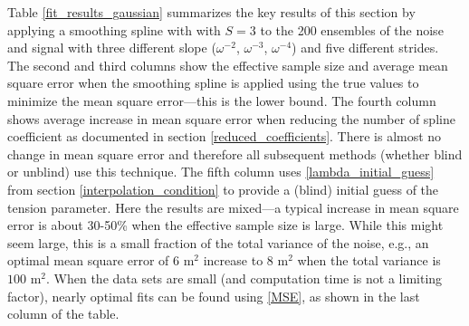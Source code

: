 \documentclass{ametsoc}
\begin{document}
Table \ref{fit_results_gaussian} summarizes the key results of this section by applying a smoothing spline with with $S=3$ to the 200 ensembles of the noise and signal with three different slope ($\omega^{-2}$, $\omega^{-3}$, $\omega^{-4}$) and five different strides. The second and third columns show the effective sample size and average mean square error when the smoothing spline is applied using the true values to minimize the mean square error---this is the lower bound. The fourth column shows average increase in mean square error when reducing the number of spline coefficient as documented in section \ref{reduced_coefficients}. There is almost no change in mean square error and therefore all subsequent methods (whether blind or unblind) use this technique. The fifth column uses \eqref{lambda_initial_guess} from section \ref{interpolation_condition} to provide a (blind) initial guess of the tension parameter. Here the results are mixed---a typical increase in mean square error is about 30-50\% when the effective sample size is large. While this might seem large, this is a small fraction of the total variance of the noise, e.g., an optimal mean square error of $6$ m$^2$ increase to $8$ m$^2$ when the total variance is $100$ m$^2$. When the data sets are small (and computation time is not a limiting factor), nearly optimal fits can be found using \eqref{MSE}, as shown in the last column of the table.

\end{document}
